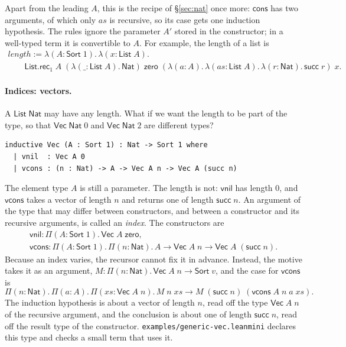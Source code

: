 \documentclass[acmsmall,screen,nonacm]{acmart}
\newcommand{\Sort}[1]{\mathsf{Sort}\;#1}
\newcommand{\tPi}[3]{\Pi(#1{:}#2).\,#3}
\newcommand{\tLam}[3]{\lambda(#1{:}#2).\,#3}
\newcommand{\Nat}{\mathsf{Nat}}
\newcommand{\zero}{\mathsf{zero}}
\newcommand{\tsucc}{\mathsf{succ}}
\begin{document}
Apart from the leading $A$, this is the recipe of \S\ref{sec:nat} once more:
$\mathsf{cons}$ has two arguments, of which only $\mathit{as}$ is recursive, so its case gets one induction hypothesis.
The rules ignore the parameter $A'$ stored in the constructor; in a well-typed term it is convertible to $A$.
For example, the length of a list is
\[
\begin{array}{l}
\mathit{length} \mathrel{:=} \tLam{A}{\Sort{1}}{\tLam{x}{\mathsf{List}\;A}{{}}} \\
\qquad \mathsf{List.rec}_1\;A\;(\tLam{\_}{\mathsf{List}\;A}{\Nat})\;\zero\;(\tLam{a}{A}{\tLam{\mathit{as}}{\mathsf{List}\;A}{\tLam{r}{\Nat}{\tsucc\;r}}})\;x.
\end{array}
\]

\paragraph{Indices: vectors.}
A $\mathsf{List}\;\Nat$ may have any length.
What if we want the length to be part of the type, so that $\mathsf{Vec}\;\Nat\;0$ and $\mathsf{Vec}\;\Nat\;2$ are different types?
\begin{lstlisting}[numbers=none, columns=fullflexible, keepspaces=true]
inductive Vec (A : Sort 1) : Nat -> Sort 1 where
  | vnil  : Vec A 0
  | vcons : (n : Nat) -> A -> Vec A n -> Vec A (succ n)
\end{lstlisting}
The element type $A$ is still a parameter.
The length is not: $\mathsf{vnil}$ has length $0$, and $\mathsf{vcons}$ takes a vector of length $n$ and returns one of length $\tsucc\;n$.
An argument of the type that may differ between constructors, and between a constructor and its recursive arguments, is called an \emph{index}.
The constructors are
\[
\begin{array}{l}
\mathsf{vnil} : \tPi{A}{\Sort{1}}{\mathsf{Vec}\;A\;\zero}, \\
\mathsf{vcons} : \tPi{A}{\Sort{1}}{\tPi{n}{\Nat}{A \to \mathsf{Vec}\;A\;n \to \mathsf{Vec}\;A\;(\tsucc\;n)}}.
\end{array}
\]
Because an index varies, the recursor cannot fix it in advance.
Instead, the motive takes it as an argument, $M : \tPi{n}{\Nat}{\mathsf{Vec}\;A\;n \to \Sort{v}}$, and the case for $\mathsf{vcons}$ is
\[
\tPi{n}{\Nat}{\tPi{a}{A}{\tPi{\mathit{xs}}{\mathsf{Vec}\;A\;n}{M\;n\;\mathit{xs} \to M\;(\tsucc\;n)\;(\mathsf{vcons}\;A\;n\;a\;\mathit{xs})}}}.
\]
The induction hypothesis is about a vector of length $n$, read off the type $\mathsf{Vec}\;A\;n$ of the recursive argument,
and the conclusion is about one of length $\tsucc\;n$, read off the result type of the constructor.
\texttt{examples/generic-vec.leanmini} declares this type and checks a small term that uses it.
\end{document}
